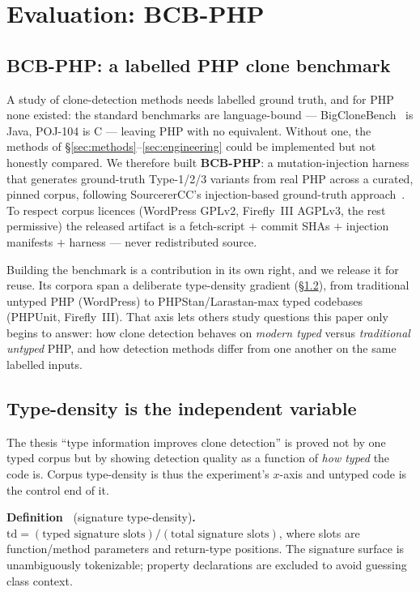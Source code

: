 \documentclass[10pt,a4paper]{article}
\newcounter{defn}[section]
\newcommand{\defn}[1]{\par\medskip\refstepcounter{defn}%
  \noindent\textbf{Definition~\thedefn} (#1)\textbf{.}\ }
\newcounter{prop}[section]
\newcounter{lem}[section]
\begin{document}
\section{Evaluation: BCB-PHP}
\label{sec:eval}

\subsection{BCB-PHP: a labelled PHP clone benchmark}
A study of clone-detection methods needs labelled ground truth, and for PHP none existed: the standard
benchmarks are language-bound --- BigCloneBench~\cite{bigclonebench} is Java, POJ-104 is C --- leaving
PHP with no equivalent. Without one, the methods of \S\ref{sec:methods}--\ref{sec:engineering} could
be implemented but not honestly compared. We therefore built \textbf{BCB-PHP}: a mutation-injection
harness that generates ground-truth Type-1/2/3 variants from real PHP across a curated, pinned corpus,
following SourcererCC's injection-based ground-truth approach~\cite{sourcerercc}. To respect corpus
licences (WordPress GPLv2, Firefly~III AGPLv3, the rest permissive) the released artifact is a
fetch-script $+$ commit SHAs $+$ injection manifests $+$ harness --- never redistributed source.

Building the benchmark is a contribution in its own right, and we release it for reuse. Its corpora
span a deliberate type-density gradient (\S\ref{sec:typedensity}), from traditional untyped PHP
(WordPress) to PHPStan/Larastan-max typed codebases (PHPUnit, Firefly~III). That axis lets others
study questions this paper only begins to answer: how clone detection behaves on \emph{modern typed}
versus \emph{traditional untyped} PHP, and how detection methods differ from one another on the same
labelled inputs.

\subsection{Type-density is the independent variable}
\label{sec:typedensity}
The thesis ``type information improves clone detection'' is proved not by one typed corpus but by
showing detection quality as a function of \emph{how typed} the code is. Corpus type-density is thus
the experiment's $x$-axis and untyped code is the control end of it.

\defn{signature type-density}
$\mathrm{td} = (\text{typed signature slots}) / (\text{total signature slots})$, where slots are
function/method parameters and return-type positions. The signature surface is unambiguously
tokenizable; property declarations are excluded to avoid guessing class context.
\end{document}
